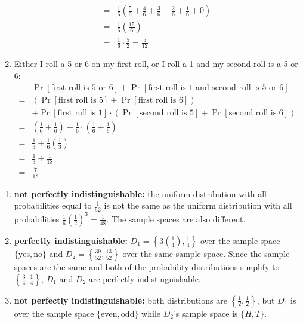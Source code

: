 \begin{answer}
\begin{enumerate}
\begin{align*}
            =& \frac{1}{6} \left(
                \frac{5}{6}+\frac{4}{6}+\frac{3}{6}+\frac{2}{6}+\frac{1}{6}+0
            \right)\\
            =& \frac{1}{6} \left( \frac{15}{6}\right)\\
            =& \frac{1}{6} \cdot \frac{5}{2} = \frac{5}{12}
        \end{align*}
        \item Either I roll a 5 or 6 on my first roll, or I roll a 1 and my second roll is 
        a 5 or 6:
        \begin{align*}
            &\Pr[\text{first roll is 5 or 6}]
            + \Pr[\text{first roll is 1 and second roll is 5 or 6}]\\
            =&\left(\Pr[\text{first roll is }5]
            +\Pr[\text{first roll is }6]\right)\\
            &+\Pr[\text{first roll is 1}] \cdot
            \left(\Pr[\text{second roll is 5}] + \Pr[\text{second roll is 6}]\right)\\
            =&\left(\frac{1}{6}+\frac{1}{6}\right) + \frac{1}{6} \cdot \left(\frac{1}{6}+\frac{1}{6}\right)\\
            =&\frac{1}{3}+\frac{1}{6}\left(\frac{1}{3}\right)\\
            =&\frac{1}{3}+\frac{1}{18}\\
            =&\frac{7}{18}
        \end{align*}
    \end{enumerate}
\end{answer}

\begin{answer}
    \renewcommand{\labelenumi}{(\alph{enumi})}
    \begin{enumerate}
        \item \textbf{not perfectly indistinguishable:}
        the uniform distribution with all probabilities equal to 
        $\frac{1}{52}$ is not the same as the uniform distribution 
        with all probabilities $\frac{1}{6}\left(\frac{1}{2}\right)^3 
        = \frac{1}{48}$. The sample spaces are also different.
        \item \textbf{perfectly indistinguishable:}
        $D_1 = \left\{3\left(\frac{1}{4}\right),\frac{1}{4}\right\}$ over the sample space $\{\text{yes}, \text{no}\}$ and 
        $D_2 = \left\{\frac{39}{52},\frac{13}{52}\right\}$ over the same sample space. Since the sample spaces are the same and both of the probability distributions simplify to
        $\left\{\frac{3}{4},\frac{1}{4}\right\}$, $D_1$ and $D_2$ are perfectly indistinguishable.
        \item \textbf{not perfectly indistinguishable:} 
        both distributions are $\left\{\frac{1}{2},\frac{1}{2}\right\}$, but $D_1$ is over the sample space $\{\text{even}, \text{odd}\}$ while $D_2$'s sample space is $\{H, T\}$.
    \end{enumerate}
\end{answer}

